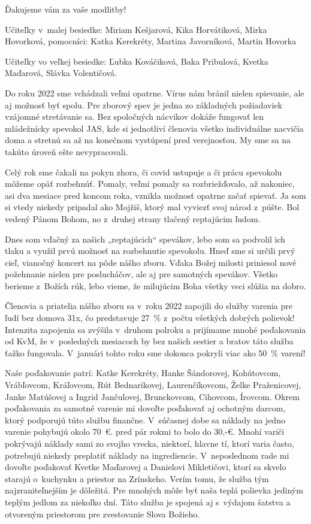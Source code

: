 Ďakujeme vám za vaše modlitby!

Učiteľky v~malej besiedke: Miriam Kešjarová, Kika Horvátiková, Mirka Hovorková, pomocníci: Katka Kerekréty, Martina Javorníková, Martin Hovorka

Učiteľky vo veľkej besiedke: Ľubka Kováčiková, Baka Pribulová, Kvetka Maďarová, Slávka Volentičová.




Do roku 2022 sme vchádzali veľmi opatrne. Vírus nám bránil nielen spievanie, ale aj možnosť byť spolu. Pre zborový spev je jedna zo základných požiadaviek vzájomné stretávanie sa. Bez spoločných nácvikov dokáže fungovať len mládežnícky spevokol JAS, kde si jednotliví členovia všetko individuálne nacvičia doma a stretnú sa až na konečnom vystúpení pred verejnosťou. My sme sa na takúto úroveň ešte nevypracovali.

Celý rok sme čakali na pokyn zhora, či covid ustupuje a či prácu spevokolu môžeme opäť rozbehnúť. Pomaly, veľmi pomaly sa rozbriežďovalo, až nakoniec, asi dva mesiace pred koncom roka, vznikla možnosť opatrne začať spievať. Ja som si vtedy niekedy pripadal ako Mojžiš, ktorý mal vyviezť svoj národ z~púšte. Bol vedený Pánom Bohom, no z~druhej strany tlačený reptajúcim ľudom.

Dnes som vďačný za našich „reptajúcich“ spevákov, lebo som sa podvolil ich tlaku a využil prvú možnosť na rozbehnutie spevokolu. Hneď sme si určili prvý cieľ, vianočný koncert na pôde nášho zboru. Vďaka Božej milosti priniesol nové požehnanie nielen pre poslucháčov, ale aj pre samotných spevákov.
Všetko berieme z~Božích rúk, lebo vieme, že milujúcim Boha všetky veci slúžia na dobro.




Členovia a priatelia nášho zboru sa v~roku 2022 zapojili do služby varenia pre ľudí bez domova 31x, čo predstavuje 27~\% z~počtu všetkých dobrých polievok!
Intenzita zapojenia sa zvýšila v~druhom polroku a prijímame mnohé poďakovania od KvM, že v~posledných mesiacoch by bez našich sestier a bratov táto služba ťažko fungovala. V~januári tohto roku sme dokonca pokryli viac ako 50~\% varení!

Naše poďakovanie patrí: Katke Kerekréty, Hanke Šándorovej, Kohútovcom, Vrábľovcom, Kráľovcom, Rút Bednarikovej, Laurenčíkovcom, Želke Praženicovej, Janke Matúšovej a Ingrid Jančulovej, Brunckovcom, Cihovcom, Írovcom.
Okrem poďakovania za samotné varenie mi dovoľte poďakovať aj ochotným darcom, ktorý podporujú túto službu finančne. V~súčasnej dobe sa náklady na jedno varenie pohybujú okolo 70~€. pred pár rokmi to bolo do 30,-€.
Mnohí variči pokrývajú náklady sami zo svojho vrecka, niektorí, hlavne tí, ktorí varia často, potrebujú niekedy preplatiť náklady na ingrediencie. V~neposlednom rade mi dovoľte poďakovať Kvetke Maďarovej a Danielovi Mikletičovi, ktorí sa skvelo starajú o~kuchynku a priestor na Zrínskeho.
Verím tomu, že služba tým najzraniteľnejším je dôležitá. Pre mnohých môže byť naša teplá polievka jediným teplým jedlom za niekoľko dní. Táto služba je spojená aj s~výdajom šatstva a otvoreným priestorom pre zvestovanie Slova Božieho.

